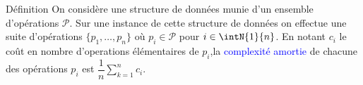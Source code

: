 \documentclass[10pt]{beamer}
\begin{document}
\begin{frame}[fragile]{\Ctitle}{\stitle}
	\begin{alertblock}{Définition}
		On considère une structure de données munie d'un ensemble d'opérations $\mathcal{P}$. Sur une instance de cette structure de données on effectue une suite d'opérations $\{p_1, \dots, p_n\}$ où $p_i \in \mathcal{P}$ pour $i \in \intN{1}{n}$.
		En notant $c_i$ le coût en nombre d'operations élémentaires de $p_i$,la \textcolor{blue}{complexité amortie} de chacune des opérations $p_i$ est  $\displaystyle\dfrac{1}{n}{\sum_{k=1}^n c_i}$.
	\end{alertblock}
\end{frame}
\end{document}
